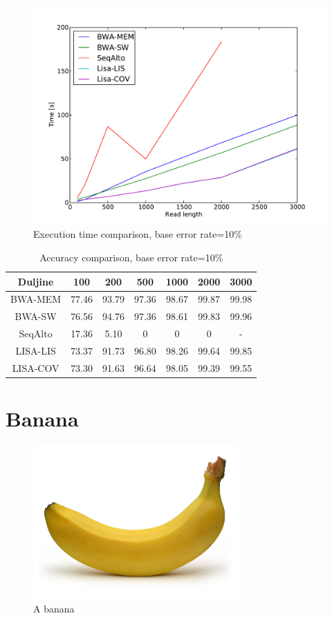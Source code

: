 \documentclass[times, utf8, diplomski]{fer}
\begin{document}
\begin{figure}[H]
\centering
\includegraphics[width=1.0\textwidth]{../img/yersinia-e10-time.pdf}
\caption{Execution time comparison, base error rate=10\%}\label{yersinia-e10-time}
\end{figure}

\begin{table}[H]
\centering
\begin{tabular}{|c||c|c|c|c|c|c|}
\hline
	Duljine & 100 & 200 & 500 & 1000 & 2000 & 3000\\
\hline
\hline
	BWA-MEM & 77.46 & 93.79 & 97.36 & 98.67 & 99.87 & 99.98\\
\hline
	BWA-SW  & 76.56 & 94.76 & 97.36 & 98.61 & 99.83 & 99.96\\
\hline
	SeqAlto & 17.36 & 5.10 & 0 & 0 & 0 & -\\
\hline
	LISA-LIS   & 73.37 & 91.73 & 96.80 & 98.26 & 99.64 & 99.85\\
\hline
	LISA-COV  & 73.30 & 91.63 & 96.64 & 98.05 & 99.39 & 99.55\\
\hline
\end{tabular}
\caption{Accuracy comparison, base error rate=10\%}\label{yersinia-e10-correct}
\end{table}


\section{Banana}

\begin{figure}[H]
\centering
\includegraphics[width=0.7\textwidth]{../img/banana.jpg}
\caption{A banana}\label{banana}
\end{figure}
\end{document}
